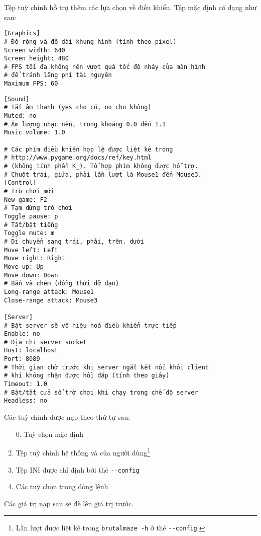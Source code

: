 \documentclass[a4paper,12pt]{article}
\begin{document}
Tệp tuỳ chỉnh hỗ trợ thêm các lựa chọn về điều khiển. Tệp mặc định có dạng như
sau:
\begin{verbatim}
[Graphics]
# Độ rộng và độ dài khung hình (tính theo pixel)
Screen width: 640
Screen height: 480
# FPS tối đa không nên vượt quá tốc độ nháy của màn hình
# để tránh lãng phí tài nguyên
Maximum FPS: 60
\end{verbatim}

\newpage
\begin{verbatim}
[Sound]
# Tắt âm thanh (yes cho có, no cho không)
Muted: no
# Âm lượng nhạc nền, trong khoảng 0.0 đến 1.1
Music volume: 1.0

# Các phím điều khiển hợp lệ được liệt kê trong
# http://www.pygame.org/docs/ref/key.html
# (không tính phần K_). Tổ hợp phím không được hỗ trợ.
# Chuột trái, giữa, phải lần lượt là Mouse1 đến Mouse3.
[Control]
# Trò chơi mới
New game: F2
# Tạm dừng trò chơi
Toggle pause: p
# Tắt/bật tiếng
Toggle mute: m
# Di chuyển sang trái, phải, trên. dưới
Move left: Left
Move right: Right
Move up: Up
Move down: Down
# Bắn và chém (đồng thời đỡ đạn)
Long-range attack: Mouse1
Close-range attack: Mouse3

[Server]
# Bật server sẽ vô hiệu hoá điều khiển trực tiếp
Enable: no
# Địa chỉ server socket
Host: localhost
Port: 8089
# Thời gian chờ trước khi server ngắt kết nối khỏi client
# khi không nhận được hồi đáp (tính theo giây)
Timeout: 1.0
# Bật/tắt cửa sổ trờ chơi khi chạy trong chế độ server
Headless: no
\end{verbatim}
Các tuỳ chỉnh được nạp theo thứ tự sau:
\begin{enumerate}
  \item[0.] Tuỳ chọn mặc định
  \item Tệp tuỳ chỉnh hệ thống và của người dùng\footnote{Lần lượt được liệt kê
    trong \texttt{brutalmaze -h} ở thẻ \texttt{-{}-config}.}
  \item Tệp INI được chỉ định bởi thẻ \verb|--config|
  \item Các tuỳ chọn trong dòng lệnh
\end{enumerate}
Các giá trị nạp sau sẽ đè lên giá trị trước.
\end{document}
